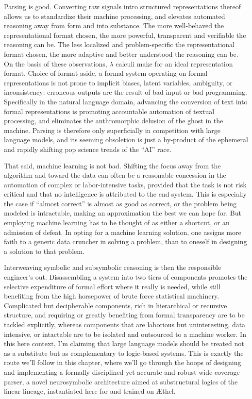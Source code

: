 Parsing is good.
Converting raw signals intro structured representations thereof allows us to standardize their machine processing, and elevates automated reasoning away from form and into substance.
The more well-behaved the representational format chosen, the more powerful, transparent and verifiable the reasoning can be.
The less localized and problem-specific the representational format chosen, the more adaptive and better understood the reasoning can be.
On the basis of these observations, $\lambda$ calculi make for an ideal representation format.
Choice of format aside, a formal system operating on formal representations is not prone to implicit biases, latent variables, ambiguity, or inconsistency: erroneous outputs are the result of bad input or bad programming.
Specifically in the natural language domain, advancing the conversion of text into formal representations is promoting accountable automation of textual processing, and eliminates the anthromorphic delusion of the ghost in the machine.
Parsing is therefore only superficially in competition with large language models, and its seeming obsoletion is just a by-product of the ephemeral and rapidly shifting pop science trends of the ``AI'' race.

That said, machine learning is not bad.
Shifting the focus away from the algorithm and toward the data can often be a reasonable concession in the automation of complex or labor-intensive tasks, provided that the task is not risk critical and that no intelligence is attributed to the end system.
This is especially the case if ``almost correct'' is almost as good as correct, or the problem being modeled is intractable, making an approximation the best we can hope for.
But employing machine learning has to be thought of as either a shortcut, or an admission of defeat.
In opting for a machine learning solution, one assigns more faith to a generic data cruncher in solving a problem, than to oneself in designing a solution to that problem.

Interweaving symbolic and subsymbolic reasoning is then the responsible engineer's out.
Disassembling a system into two tiers of components promotes the selective expenditure of formal effort where it really is needed, while still benefiting from the  high horsepower of brute force statistical machinery.
Complicated but decipherable components, rich in hierarchical or recursive structure, and requiring or greatly benefiting from formal transparency are to be tackled explicitly, whereas components that are laborious but uninteresting, data intensive, or intactable are to be isolated and outsourced to a machine worker.
In this here context, I'm claiming that large language models should be treated not as a substitute but as complementary to logic-based systems.
This is exactly the route we'll follow in this chapter, where we'll go through the hoops of designing and implementing a formally disciplined yet accurate and robust wide-coverage parser, a novel neurosymbolic architecture aimed at substructural logics of the linear lineage, instantiated here for \NLPplus{} and trained on \AE thel.

